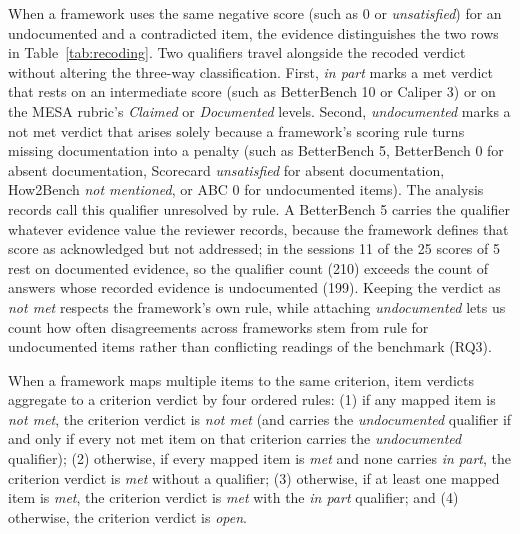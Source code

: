 \documentclass[10pt,conference]{IEEEtran}
\begin{document}
When a framework uses the same negative score (such as 0 or \emph{unsatisfied}) for an undocumented and a contradicted item, the evidence distinguishes the two rows in Table~\ref{tab:recoding}. Two qualifiers travel alongside the recoded verdict without altering the three-way classification. First, \emph{in part} marks a met verdict that rests on an intermediate score (such as BetterBench 10 or Caliper 3) or on the MESA rubric's \emph{Claimed} or \emph{Documented} levels. Second, \emph{undocumented} marks a not met verdict that arises solely because a framework's scoring rule turns missing documentation into a penalty (such as BetterBench 5, BetterBench 0 for absent documentation, Scorecard \emph{unsatisfied} for absent documentation, How2Bench \emph{not mentioned}, or ABC 0 for undocumented items). The analysis records call this qualifier unresolved by rule. A BetterBench 5 carries the qualifier whatever evidence value the reviewer records, because the framework defines that score as acknowledged but not addressed; in the sessions 11 of the 25 scores of 5 rest on documented evidence, so the qualifier count (210) exceeds the count of answers whose recorded evidence is undocumented (199). Keeping the verdict as \emph{not met} respects the framework's own rule, while attaching \emph{undocumented} lets us count how often disagreements across frameworks stem from rule for undocumented items rather than conflicting readings of the benchmark (RQ3).

When a framework maps multiple items to the same criterion, item verdicts aggregate to a criterion verdict by four ordered rules: (1) if any mapped item is \emph{not met}, the criterion verdict is \emph{not met} (and carries the \emph{undocumented} qualifier if and only if every not met item on that criterion carries the \emph{undocumented} qualifier); (2) otherwise, if every mapped item is \emph{met} and none carries \emph{in part}, the criterion verdict is \emph{met} without a qualifier; (3) otherwise, if at least one mapped item is \emph{met}, the criterion verdict is \emph{met} with the \emph{in part} qualifier; and (4) otherwise, the criterion verdict is \emph{open}.
\end{document}
